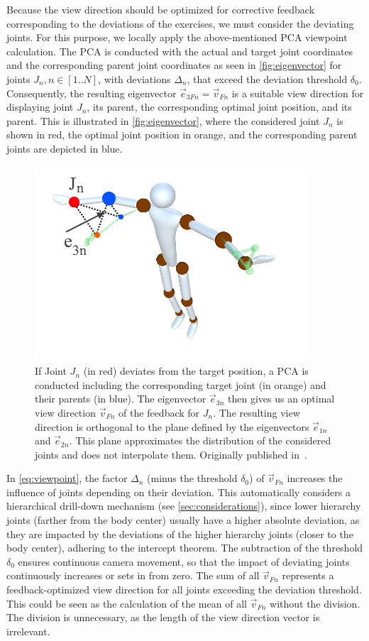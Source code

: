 Because the view direction should be optimized for corrective feedback corresponding to the deviations of the exercises, we must consider the deviating joints. For this purpose, we locally apply the above-mentioned PCA viewpoint calculation. The PCA is conducted with the actual and target joint coordinates and the corresponding parent joint coordinates as seen in \autoref{fig:eigenvector} for joints \(J_n, n \in [1..N]\), with deviations \(\Delta_n\), that exceed the deviation threshold \(\delta_0\). Consequently, the resulting eigenvector \(\vec{e}_{3Fn} = \vec{v}_{Fn}\) is a suitable view direction for displaying joint \(J_n\), its parent, the corresponding optimal joint position, and its parent. This is illustrated in \autoref{fig:eigenvector}, where the considered joint \(J_n\) is shown in red, the optimal joint position in orange, and the corresponding parent joints are depicted in blue.

\begin{figure}[tb]
	\centering
	\includegraphics[width=0.5\linewidth]{pictures/eigenvector.png}
	\caption{If Joint \(J_n\) (in red) deviates from the target position, a PCA is conducted including the corresponding target joint (in orange) and their parents (in blue). The eigenvector \(\vec{e}_{3n}\) then gives us an optimal view direction \(\vec{v}_{Fn}\) of the feedback for \(J_n\). The resulting view direction is orthogonal to the plane defined by the eigenvectors \(\vec{e}_{1n}\) and \(\vec{e}_{2n}\). This plane approximates the distribution of the considered joints and does not interpolate them. Originally published in~\cite{diller2024automatic}.}
	\label{fig:eigenvector}
\end{figure}

In \autoref{eq:viewpoint}, the factor \(\Delta_n\) (minus the threshold \(\delta_0\)) of \(\vec{v}_{Fn}\) increases the influence of joints depending on their deviation. This automatically considers a hierarchical drill-down mechanism (see \autoref{sec:considerations}), since lower hierarchy joints (farther from the body center) usually have a higher absolute deviation, as they are impacted by the deviations of the higher hierarchy joints (closer to the body center), adhering to the intercept theorem. The subtraction of the threshold \(\delta_0\) ensures continuous camera movement, so that the impact of deviating joints continuously increases or sets in from zero. The sum of all \(\vec{v}_{Fn}\) represents a feedback-optimized view direction for all joints exceeding the deviation threshold. This could be seen as the calculation of the mean of all \(\vec{v}_{Fn}\) without the division. The division is unnecessary, as the length of the view direction vector is irrelevant.

